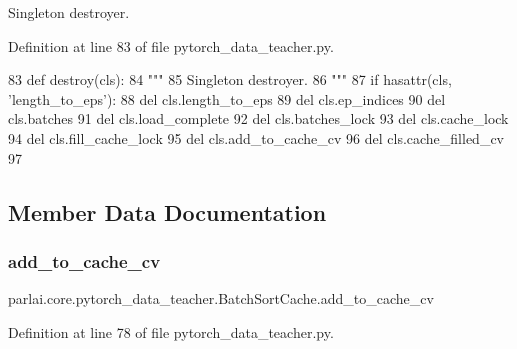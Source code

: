 \begin{DoxyVerb}Singleton destroyer.
\end{DoxyVerb}
 

Definition at line 83 of file pytorch\+\_\+data\+\_\+teacher.\+py.


\begin{DoxyCode}
83     \textcolor{keyword}{def }destroy(cls):
84         \textcolor{stringliteral}{"""}
85 \textcolor{stringliteral}{        Singleton destroyer.}
86 \textcolor{stringliteral}{        """}
87         \textcolor{keywordflow}{if} hasattr(cls, \textcolor{stringliteral}{'length\_to\_eps'}):
88             del cls.length\_to\_eps
89             del cls.ep\_indices
90             del cls.batches
91             del cls.load\_complete
92             del cls.batches\_lock
93             del cls.cache\_lock
94             del cls.fill\_cache\_lock
95             del cls.add\_to\_cache\_cv
96             del cls.cache\_filled\_cv
97 
\end{DoxyCode}


\subsection{Member Data Documentation}
\mbox{\label{classparlai_1_1core_1_1pytorch__data__teacher_1_1BatchSortCache_aee6ea11fd9febb0d4178127cffd63561}} 
\subsubsection{\texorpdfstring{add\+\_\+to\+\_\+cache\+\_\+cv}{add\_to\_cache\_cv}}
{\footnotesize\ttfamily parlai.\+core.\+pytorch\+\_\+data\+\_\+teacher.\+Batch\+Sort\+Cache.\+add\+\_\+to\+\_\+cache\+\_\+cv}



Definition at line 78 of file pytorch\+\_\+data\+\_\+teacher.\+py.

\mbox{\label{classparlai_1_1core_1_1pytorch__data__teacher_1_1BatchSortCache_a892022928bc71b59225d16eefbbfdf60}} 
